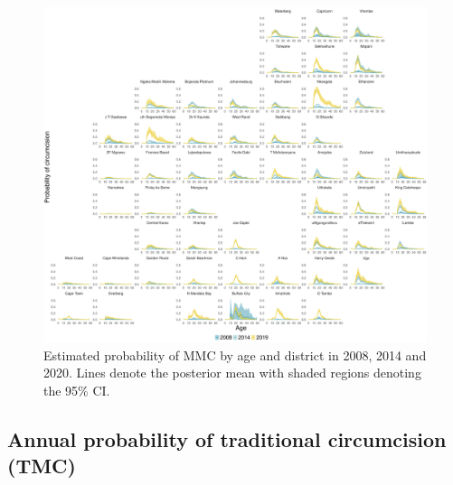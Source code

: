 \documentclass{article}
\begin{document}
\begin{appendix}
\begin{figure}[H]
	\centering
	\includegraphics[width = \linewidth]{Figures/suppmat/Rates/ProbabilityofMMC_SingleAge_District.pdf}
	\caption{Estimated probability of MMC by age and district in 2008, 2014 and 2020. Lines denote the posterior mean with shaded regions denoting the 95\% CI.}
\end{figure}	


\subsection{Annual probability of traditional circumcision (TMC)}



\end{appendix}
\end{document}

